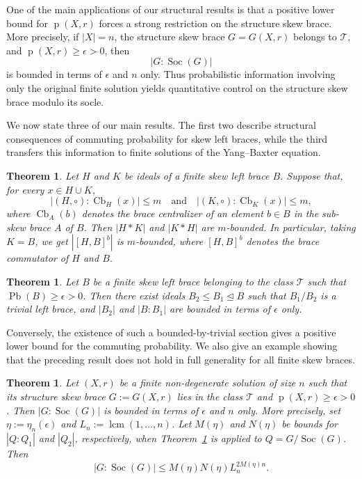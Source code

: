 \documentclass[11pt, oneside]{amsart}
\numberwithin{equation}{section}
\theoremstyle{plain}
\newtheorem{thm}[equation]{Theorem}
\theoremstyle{definition}
\newcommand{\Cb}{\operatorname{Cb} }
\newcommand{\Pb}{\operatorname{Pb} }
\newcommand{\Soc}{\operatorname{Soc} }
\begin{document}
One of the main applications of our structural results is that a positive lower bound for $\operatorname{p}(X,r)$ forces a strong restriction on the structure skew brace. More precisely, if $|X|=n$, the structure skew brace $G=G(X,r)$ belongs to $\mathcal T$, and $\operatorname{p}(X,r)\geqslant\epsilon>0$, then
$$
|G:\Soc(G)|
$$
is bounded in terms of $\epsilon$ and $n$ only. Thus probabilistic information involving only the original finite solution yields quantitative control on the structure skew brace modulo its socle.

We now state three of our main results. The first two describe structural consequences of commuting probability for skew left braces, while the third transfers this information to finite solutions of the Yang--Baxter equation.

\begin{thm} %
Let $H$ and $K$ be ideals of a finite skew left brace $B$. Suppose that, for every $x\in H\cup K$,
\[
|(H,\circ):\Cb_H(x)| \leqslant m \quad\text{and} \quad |(K,\circ):\Cb_K(x)| \leqslant m,
\]
where $\Cb_A(b)$ denotes the brace centralizer of an element $b \in B$ in the sub-skew brace $A$ of $B$.
Then $|H*K|$ and $|K*H|$ are $m$-bounded. In particular, taking $K = B$, we get $|[H, B]^b|$ is $m$-bounded, where $[H, B]^b$ denotes the brace commutator of $H$ and $B$.
\end{thm}

\begin{thm}\label{main-2}
Let $B$ be a finite skew left brace belonging to the class $\mathcal T$ such that $\Pb(B)\geqslant\epsilon>0$. Then there exist ideals $B_2 \leqslant B_1\trianglelefteq B$ such that $B_1/B_2$ is a trivial left brace, and $|B_2|$ and $|B:B_1|$ are bounded in terms of $\epsilon$ only.
\end{thm}

Conversely, the existence of such a bounded-by-trivial section gives a positive lower bound for the commuting probability. We also give an example showing that the preceding result does not hold in full generality for all finite skew braces.

\begin{thm}\label{main-3}
Let $(X,r)$ be a finite non-degenerate solution of size $n$ such that its structure skew brace $G:=G(X,r)$ lies in the class $\mathcal{T}$ and
$\operatorname{p}(X,r)\geqslant\epsilon>0$. Then
$|G:\Soc(G)|$ is bounded in terms of $\epsilon$ and $n$ only.
More precisely, set $\eta :=\eta_n(\epsilon)$ and
$L_n :=\operatorname{lcm}(1,\ldots,n)$. Let $M(\eta)$ and $N(\eta)$ be bounds for $|Q:Q_1|$ and $|Q_2|$, respectively, when Theorem~\ref{main-2} is applied to $Q=G/\Soc(G)$. Then
$$
|G :\Soc(G)|
\leqslant M(\eta)N(\eta)L_n^{2M(\eta)n}.
$$
\end{thm}
\end{document}
